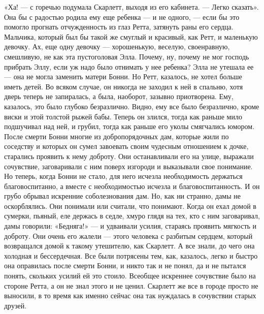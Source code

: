 «Ха! — с горечью подумала Скарлетт, выходя из его кабинета. — Легко сказать». Она бы с радостью родила ему еще ребенка — и не одного, — если бы это помогло прогнать отчужденность из глаз Ретта, затянуть раны его сердца. Мальчика, который был бы такой же смуглый и красивый, как Ретт, и маленькую девочку. Ах, еще одну девочку — хорошенькую, веселую, своенравную, смешливую, не как эта пустоголовая Элла. Почему, ну, почему не мог господь прибрать Эллу, если уж надо было отнимать у нее ребенка? Элла не утешала ее — она не могла заменить матери Бонни. Но Ретт, казалось, не хотел больше иметь детей. Во всяком случае, он никогда не заходил к ней в спальню, хотя дверь теперь не запиралась, а была, наоборот, зазывно приотворена. Ему, казалось, это было глубоко безразлично. Видно, ему все было безразлично, кроме виски и этой толстой рыжей бабы.
Теперь он злился, тогда как раньше мило подшучивал над ней, и грубил, тогда как раньше его уколы смягчались юмором. После смерти Бонни многие из добропорядочных дам, которые жили по соседству и которых он сумел завоевать своим чудесным отношением к дочке, старались проявить к нему доброту. Они останавливали его на улице, выражали сочувствие, заговаривали с ним поверх изгороди и выказывали свое понимание. Но теперь, когда Бонни не стало, для него исчезла необходимость держаться благовоспитанно, а вместе с необходимостью исчезла и благовоспитанность. И он грубо обрывал искренние соболезнования дам.
Но, как ни странно, дамы не оскорблялись. Они понимали или считали, что понимают. Когда он ехал домой в сумерки, пьяный, еле держась в седле, хмуро глядя на тех, кто с ним заговаривал, дамы говорили: «Бедняга!» — и удваивали усилия, стараясь проявить мягкость и доброту. Они очень его жалели — этого человека с разбитым сердцем, который возвращался домой к такому утешителю, как Скарлетт.
А все знали, до чего она холодная и бессердечная. Все были потрясены тем, как, казалось, легко и быстро она оправилась после смерти Бонни, и никто так и не понял, да и не пытался понять, скольких усилий ей это стоило. Всеобщее искреннее сочувствие было на стороне Ретта, а он не знал этого и не ценил. Скарлетт же все в городе просто не выносили, в то время как именно сейчас она так нуждалась в сочувствии старых друзей.
